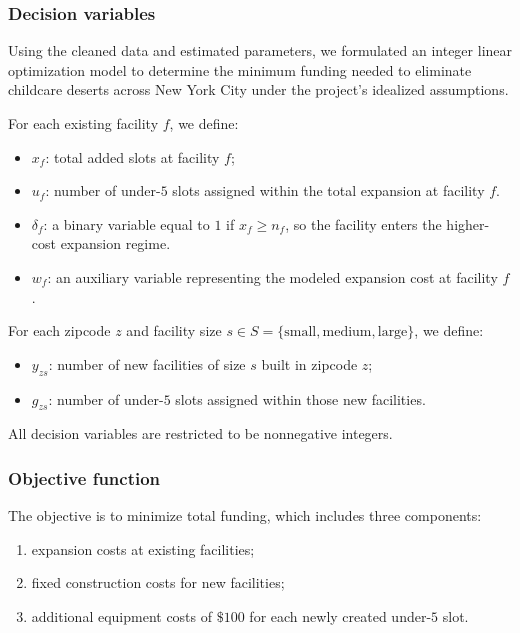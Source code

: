 \documentclass[11pt]{article}
\newcommand{\1}{\mathbb{I}}
\begin{document}
\subsubsection{Decision variables}

Using the cleaned data and estimated parameters, we formulated an integer linear optimization model to determine the minimum funding needed to eliminate childcare deserts across New York City under the project's idealized assumptions.

\noindent
For each existing facility \(f\), we define:
\begin{itemize}
    \item \(x_f\): total added slots at facility \(f\);
    \item \(u_f\): number of under-\(5\) slots assigned within the total expansion at facility \(f\).
    \item \(\delta_f\): a binary variable equal to \(1\) if \(x_f \ge n_f\), so the facility enters the higher-cost expansion regime.
    \item \(w_f\): an auxiliary variable representing the modeled expansion cost at facility \(f\).
\end{itemize}

\noindent
For each zipcode \(z\) and facility size \(s \in S=\{\text{small},\text{medium},\text{large}\}\), we define:
\begin{itemize}
    \item \(y_{zs}\): number of new facilities of size \(s\) built in zipcode \(z\);
    \item \(g_{zs}\): number of under-\(5\) slots assigned within those new facilities.
\end{itemize}

\noindent
All decision variables are restricted to be nonnegative integers.

\subsubsection{Objective function}

The objective is to minimize total funding, which includes three components:
\begin{enumerate}
    \item expansion costs at existing facilities;
    \item fixed construction costs for new facilities;
    \item additional equipment costs of \(\$100\) for each newly created under-\(5\) slot.
\end{enumerate}
\end{document}
